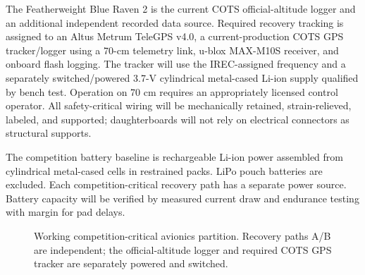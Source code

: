 \documentclass[10pt]{article}
\begin{document}
The Featherweight Blue Raven 2 is the current COTS official-altitude logger and an additional independent recorded data source. Required recovery tracking is assigned to an Altus Metrum TeleGPS v4.0, a current-production COTS GPS tracker/logger using a 70-cm telemetry link, u-blox MAX-M10S receiver, and onboard flash logging. The tracker will use the IREC-assigned frequency and a separately switched/powered 3.7-V cylindrical metal-cased Li-ion supply qualified by bench test. Operation on 70 cm requires an appropriately licensed control operator. All safety-critical wiring will be mechanically retained, strain-relieved, labeled, and supported; daughterboards will not rely on electrical connectors as structural supports.

The competition battery baseline is rechargeable Li-ion power assembled from cylindrical metal-cased cells in restrained packs. LiPo pouch batteries are excluded. Each competition-critical recovery path has a separate power source. Battery capacity will be verified by measured current draw and endurance testing with margin for pad delays.

\begin{figure}[ht]
\centering
{}
\caption{Working competition-critical avionics partition. Recovery paths A/B are independent; the official-altitude logger and required COTS GPS tracker are separately powered and switched.}
\label{fig:avionics}
\end{figure}
\end{document}
